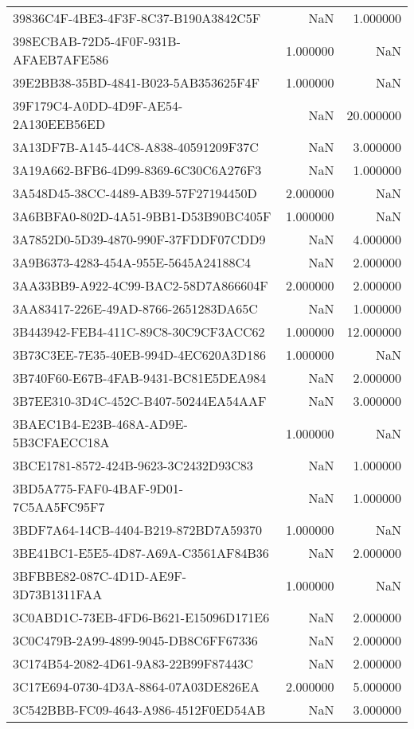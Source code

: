 \begin{tabular}{lrr}
39836C4F-4BE3-4F3F-8C37-B190A3842C5F & NaN & 1.000000 \\
398ECBAB-72D5-4F0F-931B-AFAEB7AFE586 & 1.000000 & NaN \\
39E2BB38-35BD-4841-B023-5AB353625F4F & 1.000000 & NaN \\
39F179C4-A0DD-4D9F-AE54-2A130EEB56ED & NaN & 20.000000 \\
3A13DF7B-A145-44C8-A838-40591209F37C & NaN & 3.000000 \\
3A19A662-BFB6-4D99-8369-6C30C6A276F3 & NaN & 1.000000 \\
3A548D45-38CC-4489-AB39-57F27194450D & 2.000000 & NaN \\
3A6BBFA0-802D-4A51-9BB1-D53B90BC405F & 1.000000 & NaN \\
3A7852D0-5D39-4870-990F-37FDDF07CDD9 & NaN & 4.000000 \\
3A9B6373-4283-454A-955E-5645A24188C4 & NaN & 2.000000 \\
3AA33BB9-A922-4C99-BAC2-58D7A866604F & 2.000000 & 2.000000 \\
3AA83417-226E-49AD-8766-2651283DA65C & NaN & 1.000000 \\
3B443942-FEB4-411C-89C8-30C9CF3ACC62 & 1.000000 & 12.000000 \\
3B73C3EE-7E35-40EB-994D-4EC620A3D186 & 1.000000 & NaN \\
3B740F60-E67B-4FAB-9431-BC81E5DEA984 & NaN & 2.000000 \\
3B7EE310-3D4C-452C-B407-50244EA54AAF & NaN & 3.000000 \\
3BAEC1B4-E23B-468A-AD9E-5B3CFAECC18A & 1.000000 & NaN \\
3BCE1781-8572-424B-9623-3C2432D93C83 & NaN & 1.000000 \\
3BD5A775-FAF0-4BAF-9D01-7C5AA5FC95F7 & NaN & 1.000000 \\
3BDF7A64-14CB-4404-B219-872BD7A59370 & 1.000000 & NaN \\
3BE41BC1-E5E5-4D87-A69A-C3561AF84B36 & NaN & 2.000000 \\
3BFBBE82-087C-4D1D-AE9F-3D73B1311FAA & 1.000000 & NaN \\
3C0ABD1C-73EB-4FD6-B621-E15096D171E6 & NaN & 2.000000 \\
3C0C479B-2A99-4899-9045-DB8C6FF67336 & NaN & 2.000000 \\
3C174B54-2082-4D61-9A83-22B99F87443C & NaN & 2.000000 \\
3C17E694-0730-4D3A-8864-07A03DE826EA & 2.000000 & 5.000000 \\
3C542BBB-FC09-4643-A986-4512F0ED54AB & NaN & 3.000000 \\

\end{tabular}
